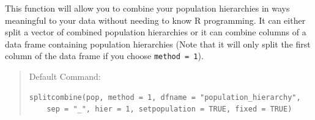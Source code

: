 \documentclass[letterpaper]{article}\usepackage[]{graphicx}\usepackage[]{color}
\makeatletter
\newenvironment{kframe}{%
 \def\at@end@of@kframe{}%
 \ifinner\ifhmode%
  \def\at@end@of@kframe{\end{minipage}}%
  \begin{minipage}{\columnwidth}%
 \fi\fi%
 \def\FrameCommand##1{\hskip\@totalleftmargin \hskip-\fboxsep
 \colorbox{shadecolor}{##1}\hskip-\fboxsep
     \hskip-\linewidth \hskip-\@totalleftmargin \hskip\columnwidth}%
 \MakeFramed {\advance\hsize-\width
   \@totalleftmargin\z@ \linewidth\hsize
   \@setminipage}}%
 {\par\unskip\endMakeFramed%
 \at@end@of@kframe}
\newenvironment{knitrout}{}{} %
\newcommand{\tab}{\hspace*{1em}}
\makeatother
\begin{document}
\tab\tab This function will allow you to combine your population hierarchies in ways meaningful to your data without needing to know R programming. It can either split a vector of combined population hierarchies or it can combine columns of a data frame containing population hierarchies (Note that it will only split the first column of the data frame if you choose \texttt{method = 1}).
\begin{quote}
Default Command:
\begin{knitrout}
\color{fgcolor}\begin{kframe}
\begin{verbatim}
splitcombine(pop, method = 1, dfname = "population_hierarchy", 
    sep = "_", hier = 1, setpopulation = TRUE, fixed = TRUE)
\end{verbatim}
\end{kframe}
\end{knitrout}

\end{quote}
\end{document}
